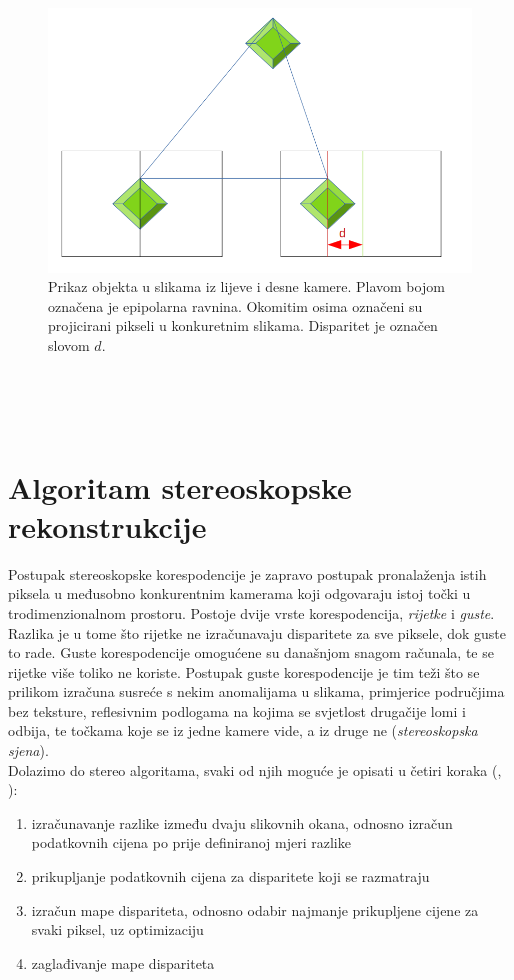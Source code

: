 \documentclass[times, utf8, zavrsni, numeric]{fer}
\begin{document}
\begin{figure}[htb]
\centering
\includegraphics[width = 14.5cm]{img/slika4.png}
\caption{Prikaz objekta u slikama iz lijeve i desne kamere. Plavom bojom označena je epipolarna ravnina. Okomitim osima označeni su projicirani pikseli u konkuretnim slikama. Disparitet je označen slovom $d$.}
\label{fig:Disparitet i epipolar}
\end{figure}\\
\\\\
\section{Algoritam stereoskopske rekonstrukcije}
Postupak stereoskopske korespodencije je zapravo postupak pronalaženja istih piksela u međusobno konkurentnim kamerama koji odgovaraju istoj točki u trodimenzionalnom prostoru. Postoje dvije vrste korespodencija, \textit{rijetke} i \textit{guste}. Razlika je u tome što rijetke ne izračunavaju disparitete za sve piksele, dok guste to rade. Guste korespodencije omogućene su današnjom snagom računala, te se rijetke više toliko ne koriste. Postupak guste korespodencije je tim teži što se prilikom izračuna susreće s nekim anomalijama u slikama, primjerice područjima bez teksture, reflesivnim podlogama na kojima se svjetlost drugačije lomi i odbija, te točkama koje se iz jedne kamere vide, a iz druge ne (\textit{stereoskopska sjena}).\\
Dolazimo do stereo algoritama, svaki od njih moguće je opisati u četiri koraka (\citep{scharszelinski}, \citep{kovac2015stereo}):
\begin{enumerate}
\item izračunavanje razlike između dvaju slikovnih okana, odnosno izračun podatkovnih cijena po prije definiranoj mjeri razlike
\item prikupljanje podatkovnih cijena za disparitete koji se razmatraju
\item izračun mape dispariteta, odnosno odabir najmanje prikupljene cijene za svaki piksel, uz optimizaciju
\item zaglađivanje mape dispariteta 
\end{enumerate}
\end{document}
